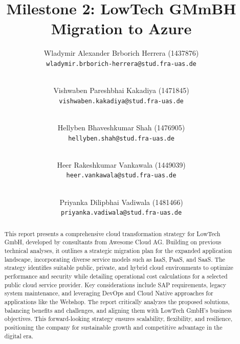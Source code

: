 \documentclass{llncs}
\newcommand{\what}{Milestone 2: LowTech GMmBH Migration to Azure}
\begin{document}
%
%
%
\mainmatter              %
%
\title{\what}
%
\author{
    Wladymir Alexander Brborich Herrera (1437876)\\
    \texttt{wladymir.brborich-herrera@stud.fra-uas.de}
    \and\\
    Vishwaben Pareshbhai Kakadiya (1471845)\\
    \texttt{vishwaben.kakadiya@stud.fra-uas.de}
    \and\\
    Hellyben Bhaveshkumar Shah (1476905)\\
    \texttt{hellyben.shah@stud.fra-uas.de}
    \and\\
    Heer Rakeshkumar Vankawala (1449039)
    \\
    \texttt{heer.vankawala@stud.fra-uas.de}
    \and\\
    Priyanka Dilipbhai Vadiwala (1481466)\\
    \texttt{priyanka.vadiwala@stud.fra-uas.de}
}
%

\maketitle              %

\begin{abstract}
    This report presents a comprehensive cloud transformation strategy for LowTech GmbH, developed by consultants from Awesome Cloud AG.
    Building on previous technical analyses, it outlines a strategic migration plan for the expanded application landscape,
    incorporating diverse service models such as IaaS, PaaS, and SaaS. The strategy identifies suitable public, private,
    and hybrid cloud environments to optimize performance and security while detailing operational cost calculations
    for a selected public cloud service provider. Key considerations include SAP requirements, legacy system maintenance,
    and leveraging DevOps and Cloud Native approaches for applications like the Webshop.
    The report critically analyzes the proposed solutions, balancing benefits and challenges,
    and aligning them with LowTech GmbH’s business objectives. This forward-looking strategy ensures scalability, flexibility, and resilience, positioning
    the company for sustainable growth and competitive advantage in the digital era.

\end{abstract}
\end{document}
